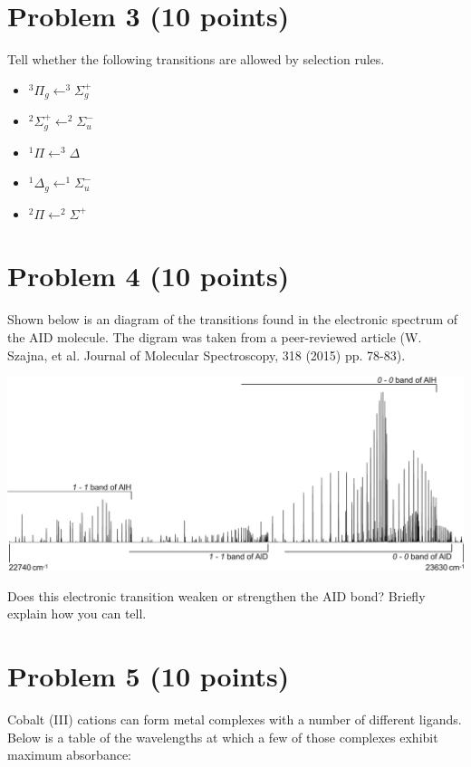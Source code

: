 \documentclass[10pt, letterpaper]{memoir}
\begin{document}
	\newpage
	\section*{Problem 3 (10 points)}	
	Tell whether the following transitions are allowed by selection rules.
	
	\begin{itemize}
		\item $^3\Pi_g \leftarrow ^3\Sigma_g^+$
		
		\vspace{2em}
		\item $^2\Sigma_g^+ \leftarrow ^2\Sigma_u^-$
		
		\vspace{2em}
		\item $^1\Pi \leftarrow ^3\Delta$
		
		\vspace{2em}
		\item $^1\Delta_g \leftarrow ^1\Sigma_u^-$
		
		\vspace{2em}
		\item $^2\Pi \leftarrow ^2\Sigma^+$
	\end{itemize}
	
	\section*{Problem 4 (10 points)}
	Shown below is an diagram of the transitions found in the electronic spectrum of the AID molecule. The digram was taken from a peer-reviewed article (W. Szajna, et al. Journal of Molecular Spectroscopy, 318 (2015) pp. 78-83).
	
	\noindent 	\includegraphics[width=\linewidth]{Band_Head}
	
	\noindent Does this electronic transition weaken or strengthen the AID bond? Briefly explain how you can tell. 

	\newpage
	\section*{Problem 5 (10 points)}
	Cobalt (III) cations can form metal complexes with a number of different ligands. Below is a table of the wavelengths at which a few of those complexes exhibit maximum absorbance:
	
\end{document}
